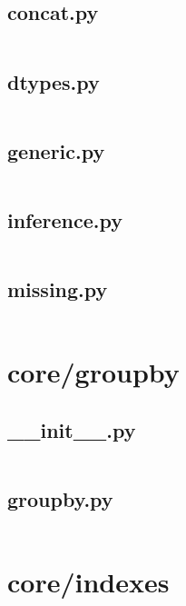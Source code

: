 \documentclass{article}
\begin{document}
\subsection{concat.py}
\inputminted{python}{/home/dufferzafar/dev/@clones/pandas/pandas/core/dtypes/concat.py}
\newpage

\subsection{dtypes.py}
\inputminted{python}{/home/dufferzafar/dev/@clones/pandas/pandas/core/dtypes/dtypes.py}
\newpage

\subsection{generic.py}
\inputminted{python}{/home/dufferzafar/dev/@clones/pandas/pandas/core/dtypes/generic.py}
\newpage

\subsection{inference.py}
\inputminted{python}{/home/dufferzafar/dev/@clones/pandas/pandas/core/dtypes/inference.py}
\newpage

\subsection{missing.py}
\inputminted{python}{/home/dufferzafar/dev/@clones/pandas/pandas/core/dtypes/missing.py}
\newpage

\section{core/groupby}

\subsection{\_\_init\_\_.py}
\inputminted{python}{/home/dufferzafar/dev/@clones/pandas/pandas/core/groupby/__init__.py}
\newpage

\subsection{groupby.py}
\inputminted{python}{/home/dufferzafar/dev/@clones/pandas/pandas/core/groupby/groupby.py}
\newpage

\section{core/indexes}
\end{document}
